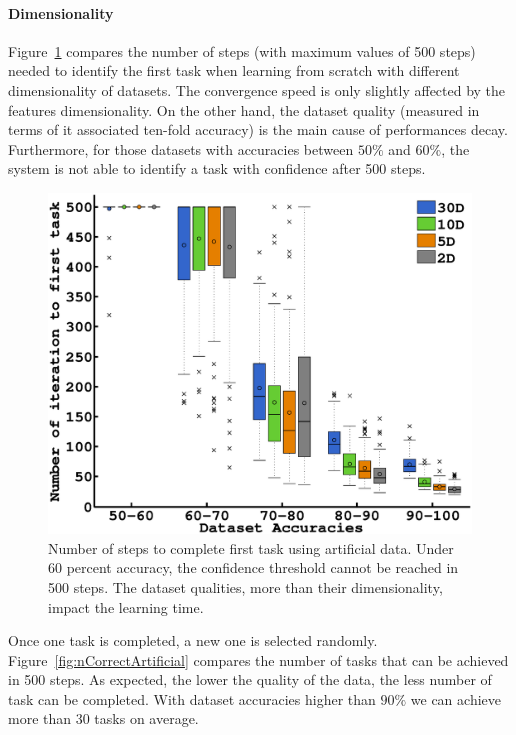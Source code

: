 \paragraph{Dimensionality}

Figure~\ref{fig:firstArtificial} compares the number of steps (with maximum values of 500 steps) needed to identify the first task when learning from scratch with different dimensionality of datasets. The convergence speed is only slightly affected by the features dimensionality. On the other hand, the dataset quality (measured in terms of it associated ten-fold accuracy) is the main cause of performances decay. Furthermore, for those datasets with accuracies between $50\%$ and $60\%$, the system is not able to identify a task with confidence after 500 steps.

\begin{figure}[!ht]
  \centering
      \includegraphics[width=\columnwidth]{img/plots_aaai/plot_artificial_firstconf.eps}
      \caption{Number of steps to complete first task using artificial data. Under 60 percent accuracy, the confidence threshold cannot be reached in 500 steps. The dataset qualities, more than their dimensionality, impact the learning time.}
      \label{fig:firstArtificial}
\end{figure} 

Once one task is completed, a new one is selected randomly. Figure~\ref{fig:nCorrectArtificial} compares the number of tasks that can be achieved in 500 steps. As expected, the lower the quality of the data, the less number of task can be completed. With dataset accuracies higher than $90\%$ we can achieve more than 30 tasks on average.

